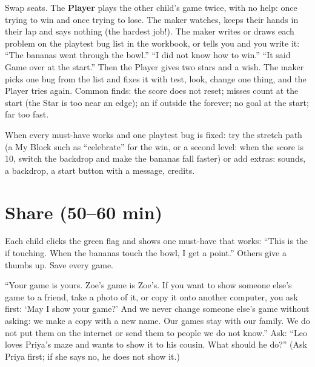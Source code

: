 \begin{bughunt}
Swap seats. The \textbf{Player} plays the other child's game twice, with no help: once trying to win and once trying to lose. The maker watches, keeps their hands in their lap and says nothing (the hardest job!). The maker writes or draws each problem on the playtest bug list in the workbook, or tells you and you write it: \enquote{The bananas went through the bowl.} \enquote{I did not know how to win.} \enquote{It said Game over at the start.} Then the Player gives two stars and a wish. The maker picks one bug from the list and fixes it with test, look, change one thing, and the Player tries again. Common finds: the score does not reset; misses count at the start (the Star is too near an edge); an if outside the forever; no goal at the start; far too fast.
\end{bughunt}

\begin{freebuild}
When every must-have works and one playtest bug is fixed: try the stretch path (a My Block such as \enquote{celebrate} for the win, or a second level: when the score is 10, switch the backdrop and make the bananas fall faster) or add extras: sounds, a backdrop, a start button with a message, credits.
\end{freebuild}

\section{Share (50--60 min)}
\begin{teacherscript}
Each child clicks the green flag and shows one must-have that works: \enquote{This is the if touching. When the bananas touch the bowl, I get a point.} Others give a thumbs up. Save every game.
\end{teacherscript}

\begin{safety}
\enquote{Your game is yours. Zoe's game is Zoe's. If you want to show someone else's game to a friend, take a photo of it, or copy it onto another computer, you ask first: \enquote{May I show your game?} And we never change someone else's game without asking: we make a copy with a new name. Our games stay with our family. We do not put them on the internet or send them to people we do not know.} Ask: \enquote{Leo loves Priya's maze and wants to show it to his cousin. What should he do?} (Ask Priya first; if she says no, he does not show it.)
\end{safety}

